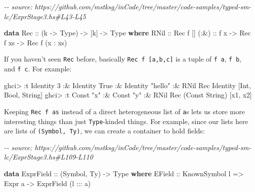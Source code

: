 \documentclass[]{article}
\newenvironment{Shaded}{}{}
\newcommand{\CommentTok}[1]{\textcolor[rgb]{0.38,0.63,0.69}{\textit{#1}}}
\newcommand{\DataTypeTok}[1]{\textcolor[rgb]{0.56,0.13,0.00}{#1}}
\newcommand{\DecValTok}[1]{\textcolor[rgb]{0.25,0.63,0.44}{#1}}
\newcommand{\KeywordTok}[1]{\textcolor[rgb]{0.00,0.44,0.13}{\textbf{#1}}}
\newcommand{\NormalTok}[1]{#1}
\newcommand{\OperatorTok}[1]{\textcolor[rgb]{0.40,0.40,0.40}{#1}}
\newcommand{\OtherTok}[1]{\textcolor[rgb]{0.00,0.44,0.13}{#1}}
\newcommand{\StringTok}[1]{\textcolor[rgb]{0.25,0.44,0.63}{#1}}
\begin{document}
\begin{Shaded}
\begin{Highlighting}[]
\CommentTok{{-}{-} source: https://github.com/mstksg/inCode/tree/master/code{-}samples/typed{-}sm{-}lc/ExprStage3.hs\#L43{-}L45}

\KeywordTok{data} \DataTypeTok{Rec}\OtherTok{ ::}\NormalTok{ (k }\OtherTok{{-}\textgreater{}} \DataTypeTok{Type}\NormalTok{) }\OtherTok{{-}\textgreater{}}\NormalTok{ [k] }\OtherTok{{-}\textgreater{}} \DataTypeTok{Type} \KeywordTok{where}
  \DataTypeTok{RNil}\OtherTok{ ::} \DataTypeTok{Rec}\NormalTok{ f \textquotesingle{}[]}
\OtherTok{  (:\&) ::}\NormalTok{ f x }\OtherTok{{-}\textgreater{}} \DataTypeTok{Rec}\NormalTok{ f xs }\OtherTok{{-}\textgreater{}} \DataTypeTok{Rec}\NormalTok{ f (x }\OperatorTok{:}\NormalTok{ xs)}
\end{Highlighting}
\end{Shaded}

If you haven't seen \texttt{Rec} before, basically \texttt{Rec\ f\ {[}a,b,c{]}}
is a tuple of \texttt{f\ a}, \texttt{f\ b}, and \texttt{f\ c}. For example:

\begin{Shaded}
\begin{Highlighting}[]
\NormalTok{ghci}\OperatorTok{\textgreater{}} \OperatorTok{:}\NormalTok{t }\DataTypeTok{Identity} \DecValTok{3} \OperatorTok{:\&} \DataTypeTok{Identity} \DataTypeTok{True} \OperatorTok{:\&} \DataTypeTok{Identity} \StringTok{"hello"} \OperatorTok{:\&} \DataTypeTok{RNil}
\DataTypeTok{Rec} \DataTypeTok{Identity}\NormalTok{ [}\DataTypeTok{Int}\NormalTok{, }\DataTypeTok{Bool}\NormalTok{, }\DataTypeTok{String}\NormalTok{]}
\NormalTok{ghci}\OperatorTok{\textgreater{}} \OperatorTok{:}\NormalTok{t }\DataTypeTok{Const} \StringTok{"x"} \OperatorTok{:\&} \DataTypeTok{Const} \StringTok{"y"} \OperatorTok{:\&} \DataTypeTok{RNil}
\DataTypeTok{Rec}\NormalTok{ (}\DataTypeTok{Const} \DataTypeTok{String}\NormalTok{) [x1, x2]}
\end{Highlighting}
\end{Shaded}

Keeping \texttt{Rec\ f\ as} instead of a direct heterogeneous list of
\texttt{a}s lets us store more interesting things than just \texttt{Type}-kinded
things. For example, since our lists here are lists of \texttt{(Symbol,\ Ty)},
we can create a container to hold fields:

\begin{Shaded}
\begin{Highlighting}[]
\CommentTok{{-}{-} source: https://github.com/mstksg/inCode/tree/master/code{-}samples/typed{-}sm{-}lc/ExprStage3.hs\#L109{-}L110}

\KeywordTok{data} \DataTypeTok{ExprField}\OtherTok{ ::}\NormalTok{ (}\DataTypeTok{Symbol}\NormalTok{, }\DataTypeTok{Ty}\NormalTok{) }\OtherTok{{-}\textgreater{}} \DataTypeTok{Type} \KeywordTok{where}
  \DataTypeTok{EField}\OtherTok{ ::} \DataTypeTok{KnownSymbol}\NormalTok{ l }\OtherTok{=\textgreater{}} \DataTypeTok{Expr}\NormalTok{ a }\OtherTok{{-}\textgreater{}} \DataTypeTok{ExprField}\NormalTok{ (l }\OperatorTok{:::}\NormalTok{ a)}
\end{Highlighting}
\end{Shaded}
\end{document}
